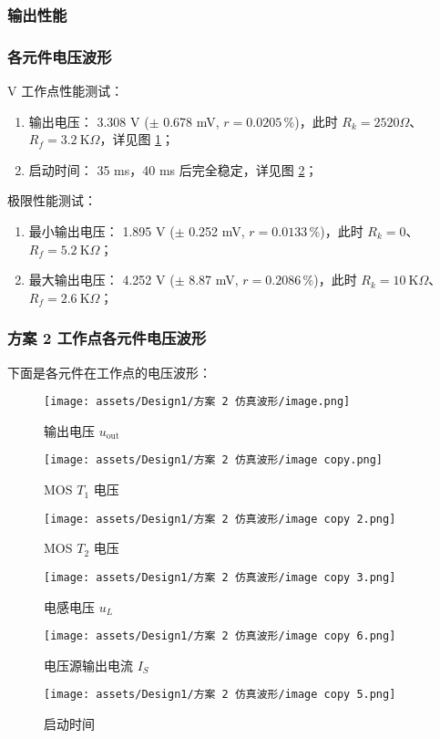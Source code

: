\documentclass[UTF8]{article}
\def\KO{\ \mathrm{K}\Omega}
\def\KO{\ \mathrm{K}\Omega}
\theoremstyle{MyLineTheoremStyle} %
\theoremstyle{MyBlockTheoremStyle} %
\theoremstyle{MySubsubsectionStyle} %
\begin{document}
\subsubsection{输出性能}
\subsubsection{各元件电压波形}
 V 工作点性能测试：
\begin{enumerate}
\item 输出电压： 3.308 V ($\pm$ 0.678 mV, $r = 0.0205 \,\%$)，此时 $R_k = 2520 \Omega$、$R_f =  3.2\KO$，详见图 \ref{输出电压 2}；
\item 启动时间： 35 ms，40 ms 后完全稳定，详见图 \ref{启动时间 2}；
\end{enumerate}

\noindent 极限性能测试：
\begin{enumerate}
\item 最小输出电压： 1.895 V ($\pm$ 0.252 mV, $r = 0.0133 \,\%$)，此时 $R_k = 0 $、$R_f =  5.2\KO$；
\item 最大输出电压： 4.252 V ($\pm$ 8.87 mV, $r = 0.2086 \,\%$)，此时 $R_k = 10 \KO$、$R_f =  2.6\KO$；
\end{enumerate}

\subsubsection{方案 2 工作点各元件电压波形}
下面是各元件在工作点的电压波形：

\begin{figure}[H]\centering
    \texttt{[image: assets/Design1/方案 2 仿真波形/image.png]}
    \caption{输出电压 $u_{\text{out}}$}
    \label{输出电压 2}
\end{figure}
\begin{figure}[H]\centering
    \texttt{[image: assets/Design1/方案 2 仿真波形/image copy.png]}
    \caption{MOS $T_1$ 电压}
\end{figure}
\begin{figure}[H]\centering
    \texttt{[image: assets/Design1/方案 2 仿真波形/image copy 2.png]}
    \caption{MOS $T_2$ 电压}
\end{figure}
\begin{figure}[H]\centering
    \texttt{[image: assets/Design1/方案 2 仿真波形/image copy 3.png]}
    \caption{电感电压 $u_L$}
\end{figure}
\begin{figure}[H]\centering
    \texttt{[image: assets/Design1/方案 2 仿真波形/image copy 6.png]}
    \caption{电压源输出电流 $I_S$}
\end{figure}
\begin{figure}[H]\centering
    \texttt{[image: assets/Design1/方案 2 仿真波形/image copy 5.png]}
    \caption{启动时间}
    \label{启动时间 2}
\end{figure}
\end{document}
